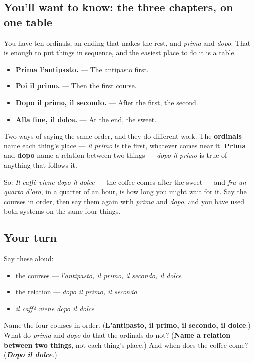 \subsection*{You'll want to know: the three chapters, on one table}
You have ten ordinals, an ending that makes the rest, and \emph{prima} and \emph{dopo}. That is enough to put things in sequence, and the easiest place to do it is a table.

\begin{itemize}
\raggedright
  \item \textbf{Prima l'antipasto.} — The antipasto first.
  \item \textbf{Poi il primo.} — Then the first course.
  \item \textbf{Dopo il primo, il secondo.} — After the first, the second.
  \item \textbf{Alla fine, il dolce.} — At the end, the sweet.
\end{itemize}

Two ways of saying the same order, and they do different work. The \textbf{ordinals} name each thing's place — \emph{il primo} is the first, whatever comes near it. \textbf{Prima} and \textbf{dopo} name a relation between two things — \emph{dopo il primo} is true of anything that follows it.

So: \emph{Il caffè viene dopo il dolce} — the coffee comes after the sweet — and \emph{fra un quarto d'ora}, in a quarter of an hour, is how long you might wait for it. Say the courses in order, then say them again with \emph{prima} and \emph{dopo}, and you have used both systems on the same four things.

\subsection*{Your turn}
Say these aloud:

\begin{itemize}
\raggedright
  \item the courses — \emph{l'antipasto, il primo, il secondo, il dolce}
  \item the relation — \emph{dopo il primo, il secondo}
  \item \emph{il caffè viene dopo il dolce}
\end{itemize}

\begin{tcolorbox}[breakable,colback=teal!4,colframe=teal!35!black,title={Before you move on}]
Name the four courses in order. (\textbf{L'antipasto, il primo, il secondo, il dolce}.) What do \emph{prima} and \emph{dopo} do that the ordinals do not? (\textbf{Name a relation between two things}, not each thing's place.) And when does the coffee come? (\emph{\textbf{Dopo il dolce}}.)
\end{tcolorbox}
